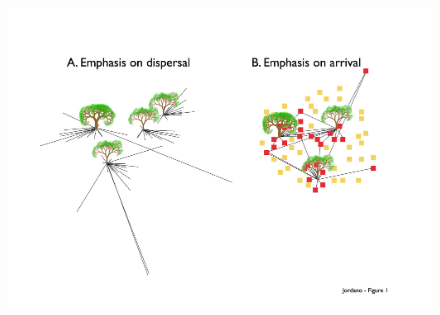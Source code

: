 \documentclass[a4paper, 12pt]{article}
\begin{document}
\begin{linenumbers}
\begin{figure}[htbp]
\centerline{\includegraphics[height=25cm]{Fig1.pdf}}
%
\end{figure}


\end{linenumbers}
\end{document}

